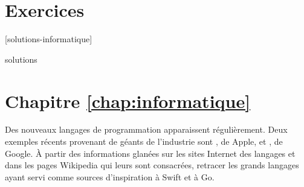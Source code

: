 \section{Exercices}
\label{operateurs:exercices}

[solutions-informatique]

\begin{Filesave}{solutions}
\section*{Chapitre \ref*{chap:informatique}}

\end{Filesave}

\begin{exercice}[nosol]
  Des nouveaux langages de programmation apparaissent régulièrement.
  Deux exemples récents provenant de géants de l'industrie sont
  , de Apple, et
  , de Google. À partir des informations
  glanées sur les sites Internet des langages et dans les pages
  Wikipedia qui leurs sont consacrées, retracer les grands langages
  ayant servi comme sources d'inspiration à Swift et à
  Go.
\end{exercice}

